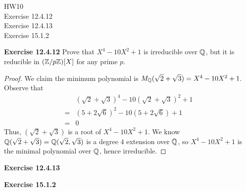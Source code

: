 \documentclass{article}
\begin{document}
\maketitle
HW10 \\
Exercise 12.4.12\\
Exercise 12.4.13\\
Exercise 15.1.2\\
\pagebreak

\begin{homeworkProblem}
    \textbf{Exercise 12.4.12} Prove that $X^4 - 10 X^2 + 1$ is irreducible over $\mathbb{Q}$, but it is reducible in $(\mathbb{Z}/p \mathbb{Z})[X]$ for any prime $p$.\\
    \solution 

    \begin{proof}
        We claim the minimum polynomial is $M_{\mathbb{Q}}(\sqrt{2} + \sqrt{3}) = X^4 - 10 X^2 + 1$.
        Observe that
        \begin{align}
            &(\sqrt{2} + \sqrt{3})^4 - 10 (\sqrt{2} + \sqrt{3})^2 + 1 \\
            =& (5 + 2 \sqrt{6})^2 - 10 (5 + 2 \sqrt{6}) + 1 \\
            =& 0
        \end{align}
        Thus, $(\sqrt{2} + \sqrt{3})$ is a root of $X^4 - 10 X^2 + 1$.
        We know $\mathbb{Q} (\sqrt{2} + \sqrt{3}) = \mathbb{Q} (\sqrt{2} , \sqrt{3})$ is a degree $4$ extension over $\mathbb{Q}$, so
        $X^4 - 10 X^2 + 1$ is the minimal polynomial over $\mathbb{Q}$, hence irreducible.
        

        
    \end{proof}



\end{homeworkProblem}

\pagebreak


\begin{homeworkProblem}
    \textbf{Exercise 12.4.13}
    \solution \\




\end{homeworkProblem}

\pagebreak

\begin{homeworkProblem}
    \textbf{Exercise 15.1.2}
    \solution \\


\end{homeworkProblem}
\end{document}
